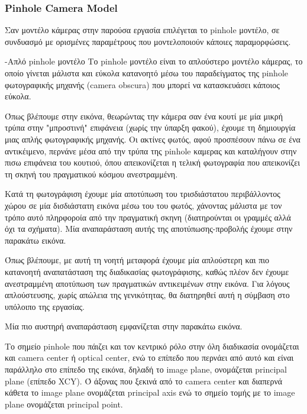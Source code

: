 \subsubsection{Pinhole Camera Model}



Σαν μοντέλο κάμερας στην παρούσα εργασία επιλέγεται το pinhole μοντέλο, σε συνδυασμό με ορισμένες παραμέτρους που μοντελοποιούν κάποιες παραμορφώσεις.

-Απλό pinhole μοντέλο
Το pinhole μοντέλο είναι το απλούστερο μοντέλο κάμερας, το οποίο γίνεται μάλιστα και εύκολα κατανοητό μέσω του παραδείγματος της pinhole φωτογραφικής μηχανής (camera obscura) που μπορεί να κατασκευάσει κάποιος εύκολα.

Όπως βλέπουμε στην εικόνα, θεωρώντας την κάμερα σαν ένα κουτί με μία μικρή τρύπα στην "μπροστινή" επιφάνεια (χωρίς την ύπαρξη φακού), έχουμε τη δημιουργία μιας απλής φωτογραφικής μηχανής. Οι ακτίνες φωτός, αφού προσπέσουν πάνω σε ένα αντικέιμενο, περνάνε μέσα από την τρύπα της pinhole καμερας και καταλήγουν στην πισω επιφάνεια του κουτιού, όπου απεικονίζεται η τελική φωτογραφία που απεικονίζει τη σκηνή του πραγματικού κόσμου ανεστραμμένη.

Κατά τη φωτογράφιση έχουμε μία αποτύπωση του τρισδιάστατου περιβάλλοντος χώρου σε μία δισδιάστατη εικόνα μέσω του του φωτός, χάνοντας μάλιστα με τον τρόπο αυτό πληρφοροία από την πραγματική σκηνη (διατηρούνται οι γραμμές αλλά όχι τα σχήματα). Μία αναπαράσταση αυτής της αποτύπωσης-προβολής έχουμε στην παρακάτω εικόνα.


Όπως βλέπουμε, με αυτή τη νοητή μεταφορά έχουμε μία απλούστερη και πιο κατανοητή αναπατάσταση της διαδικασίας φωτογράφισης, καθώς πλέον δεν έχουμε ανεστραμμένη αποτύπωση των πραγματικών αντικειμένων στην εικόνα. Για λόγους απλούστευσης, χωρίς απώλεια της γενικότητας, θα διατηρηθεί αυτή η σύμβαση στο υπόλοιπο της εργασίας.

Μία πιο αυστηρή αναπαράσταση εμφανίζεται στην παρακάτω εικόνα.

Το σημείο pinhole που πάιζει και τον κεντρικό ρόλο στην όλη διαδικασία ονομάζεται και camera center ή optical center, ενώ το επίπεδο που περνάει από αυτό και είναι παράλληλο στο επίπεδο της εικόνα, δηλαδή το image plane, ονομάζεται principal plane (επίπεδο XCY). Ό άξονας που ξεκινά από το camera center και διαπερνά κάθετα το image plane ονομάζεται principal axis ενώ το σημείο τομής με το image plane ονομάζεται principal point.

